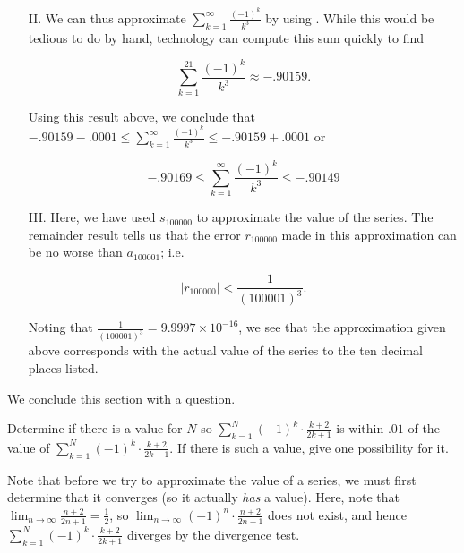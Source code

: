 \documentclass{ximera}
\begin{document}
\begin{example}
\begin{explanation}
\begin{itemize}
\item[II.] We can thus approximate $\sum_{k=1}^{\infty} \frac{(-1)^k}{k^3}$ by using .  While this would be tedious to do by hand, technology can compute this sum quickly to find 

\[
\sum_{k=1}^{21} \frac{(-1)^k}{k^3} \approx -.90159.
\]

Using this result above, we conclude that $-.90159-.0001 \leq \sum_{k=1}^{\infty} \frac{(-1)^k}{k^3} \leq -.90159+.0001$ or

\[
-.90169 \leq \sum_{k=1}^{\infty} \frac{(-1)^k}{k^3} \leq -.90149
\]
\item[III.] Here, we have used $s_{100000}$ to approximate the value of the series.  The remainder result tells us that the error $r_{100000}$ made in this approximation can be no worse than $a_{100001}$; i.e.

\[
\big|r_{100000}\big| < \frac{1}{(100001)^3}. 
\]

Noting that $\frac{1}{(100001)^3} = 9.9997 \times 10^{-16}$, we see that the approximation given above corresponds with the actual value of the series to the ten decimal places listed.

\end{itemize}
\end{explanation}
\end{example}

We conclude this section with a question.
\begin{question}
Determine if there is a value for $N$ so $\sum_{k=1}^{N} (-1)^k \cdot \frac{k+2}{2k+1}$ is within $.01$ of the value of $\sum_{k=1}^{N} (-1)^k \cdot \frac{k+2}{2k+1}$.  If there is such a value, give one possibility for it.

\begin{multipleChoice}
\end{multipleChoice}

\begin{feedback}
Note that before we try to approximate the value of a series, we must first determine that it converges (so it actually \emph{has} a value).  Here, note that $\lim_{n \to \infty} \frac{n+2}{2n+1} = \frac{1}{2}$, so $\lim_{n \to \infty} (-1)^n \cdot \frac{n+2}{2n+1}$ does not exist, and hence $\sum_{k=1}^{N} (-1)^k \cdot \frac{k+2}{2k+1}$ diverges by the divergence test.
\end{feedback}
\end{question}
\end{document}
